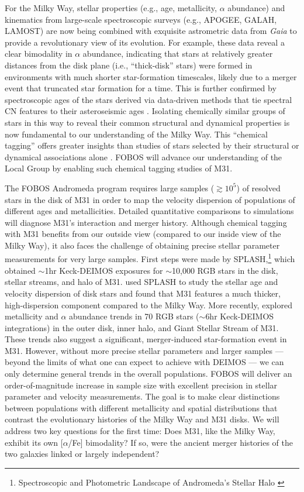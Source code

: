 \documentclass[11pt,a4paper,twoside,onecolumn,openany,final,oldfontcommands]{memoir}
\begin{document}
For the Milky Way, stellar properties (e.g., age, metallicity, $\alpha$ abundance) and kinematics from large-scale spectroscopic surveys (e.g., APOGEE, GALAH, LAMOST) are now being combined with exquisite astrometric data from \textit{Gaia} to provide a revolutionary view of its evolution.  For example, these data reveal a clear bimodality in $\alpha$ abundance, indicating that stars at relatively greater distances from the disk plane (i.e., ``thick-disk'' stars) were formed in environments with much shorter star-formation timescales, likely due to a merger event that truncated star formation for a time. This is further confirmed by spectroscopic ages of the stars derived via data-driven methods that tie spectral CN features to their asteroseismic ages \citep[e.g.][]{Martig16}.  Isolating chemically similar groups of stars in this way to reveal their common structural and dynamical properties is now fundamental to our understanding of the Milky Way.  This ``chemical tagging'' offers greater insights than studies of stars selected by their structural or dynamical associations alone \citep[e.g.,][]{Ting15}.  FOBOS will advance our understanding of the Local Group by enabling such chemical tagging studies of M31.

The FOBOS Andromeda program requires large samples ($\gtrsim 10^5$) of resolved stars in the disk of M31 in order to map the velocity dispersion of populations of different ages and metallicities.  Detailed quantitative comparisons to simulations will diagnose M31's interaction and merger history.  Although chemical tagging with M31 benefits from our outside view (compared to our inside view of the Milky Way), it also faces the challenge of obtaining precise stellar parameter measurements for very large samples.  First steps were made by SPLASH,\footnote{Spectroscopic and Photometric Landscape of Andromeda’s Stellar Halo \citep[e.g.][]{splash}} which obtained $\sim$1hr Keck-DEIMOS exposures for $\sim$10,000 RGB stars in the disk, stellar streams, and halo of M31.  \citet{dorman15} used SPLASH to study the stellar age and velocity dispersion of disk stars and found that M31 features a much thicker, high-dispersion component compared to the Milky Way.  More recently, \citet{escala20} explored metallicity and $\alpha$ abundance trends in 70 RGB stars ($\sim$6hr Keck-DEIMOS integrations) in the outer disk, inner halo, and Giant Stellar Stream of M31.  These trends also suggest a significant, merger-induced star-formation event in M31.  However, without more precise stellar parameters and larger samples --- beyond the limits of what one can expect to achieve with DEIMOS --- we can only determine general trends in the overall populations.  FOBOS will deliver an order-of-magnitude increase in sample size with excellent precision in stellar parameter and velocity measurements.  The goal is to make clear distinctions between populations with different metallicity and spatial distributions that contrast the evolutionary histories of the Milky Way and M31 disks.  We will address two key questions for the first time: Does M31, like the Milky Way, exhibit its own [$\alpha$/Fe] bimodality?  If so, were the ancient merger histories of the two galaxies linked or largely independent? 
\end{document}
